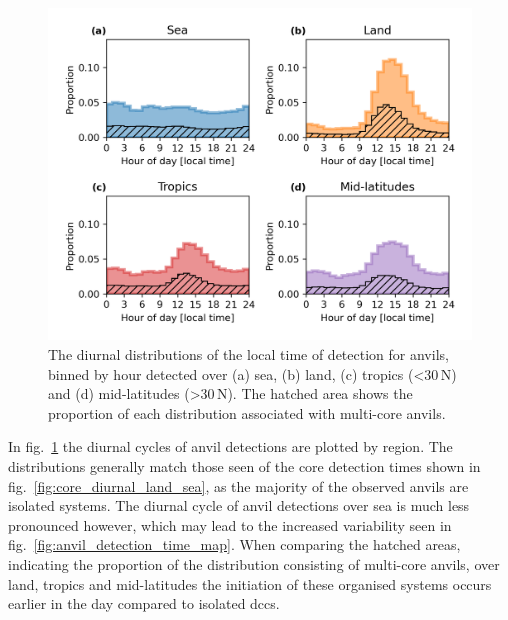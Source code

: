 \begin{figure}[tp]
    \centering
    \includegraphics[width=\textwidth]{figures/chapter2_24.png}
    \caption[
    The diurnal distributions of the local time of detection for anvils detected over sea, land, tropics and mid-latitudes
    ]{
    The diurnal distributions of the local time of detection for anvils, binned by hour detected over (a) sea, (b) land, (c) tropics (\textless 30\,\textdegree N) and (d) mid-latitudes (\textgreater 30\,\textdegree N). The hatched area shows the proportion of each distribution associated with multi-core anvils.
    }
    \label{fig:anvil_diurnal_distributions}
\end{figure}

In fig.~\ref{fig:anvil_diurnal_distributions} the diurnal cycles of anvil detections are plotted by region.
The distributions generally match those seen of the core detection times shown in fig.~\ref{fig:core_diurnal_land_sea}, as the majority of the observed anvils are isolated systems.
The diurnal cycle of anvil detections over sea is much less pronounced however, which may lead to the increased variability seen in fig.~\ref{fig:anvil_detection_time_map}.
When comparing the hatched areas, indicating the proportion of the distribution consisting of multi-core anvils, over land, tropics and mid-latitudes the initiation of these organised systems occurs earlier in the day compared to isolated \acrshort{dcc}s.

